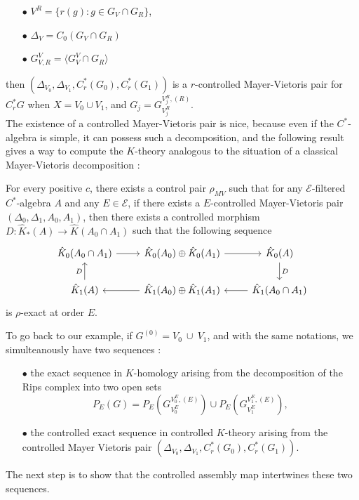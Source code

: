 \begin{itemize}
\item[$\bullet$] $V^R= \{r(g) : g\in G_V\cap G_R\}$,
\item[$\bullet$] $\Delta_V = C_0(G_V\cap G_R)$
\item[$\bullet$] $G_{V,R}^V = \langle G_V^V \cap G_R \rangle$\\
\end{itemize} 

then $(\Delta_{V_0},\Delta_{V_1}, C_r^*(G_0),C_r^*(G_1))$ is a $r$-controlled Mayer-Vietoris pair for $C^*_r G$ when $X=V_0\cup V_1$, and $G_j = G_{V_j^R}^{V_j^R , (R)}$.\\

The existence of a controlled Mayer-Vietoris pair is nice, because even if the $C^*$-algebra is simple, it can possess such a decomposition, and the following result gives a way to compute the $K$-theory analogous to the situation of a classical Mayer-Vietoris decomposition :

\begin{thm}
For every positive $c$, there exists a control pair $\rho_{MV}$ such that for any $\mathcal E$-filtered $C^*$-algebra $A$ and any $E\in\mathcal E$, if there exists a $E$-controlled Mayer-Vietoris pair $(\Delta_0,\Delta_1,A_0,A_1)$, then there exists a controlled morphism $D : \hat K_*(A)\rightarrow \hat K(A_0\cap A_1)$ such that the following sequence 
\[\begin{tikzcd}
\hat K_0(A_0\cap A_1 ) \arrow{r}& \hat K_0(A_0)\arrow{r}\oplus \hat K_0(A_1) & \hat K_0(A)\arrow{d}{D} \\
\arrow{u}{D}\hat K_1(A) &\arrow{l} \hat K_1(A_0)\oplus \hat K_1(A_1) & \arrow{l}\hat K_1(A_0\cap A_1) 
\end{tikzcd}\]
is $\rho$-exact at order $E$.
\end{thm}

To go back to our example, if $G^{(0)} = V_0\ \cup \ V_1 $, and with the same notations, we simulteanously have two sequences : \\
\begin{itemize}
\item[$\bullet$] the exact sequence in $K$-homology arising from the decomposition of the Rips complex into two open sets 
\[P_E(G) = P_E(G^{V_0^E,(E)}_{V_0^E}) \cup P_E(G^{V_1^E,(E)}_{V_1^E}) ,\] 
\item[$\bullet$] the controlled exact sequence in controlled $K$-theory arising from the controlled Mayer Vietoris pair $(\Delta_{V_0},\Delta_{V_1}, C_r^*(G_0),C_r^*(G_1))$. \\
\end{itemize}
The next step is to show that the controlled assembly map intertwines these two sequences. %

